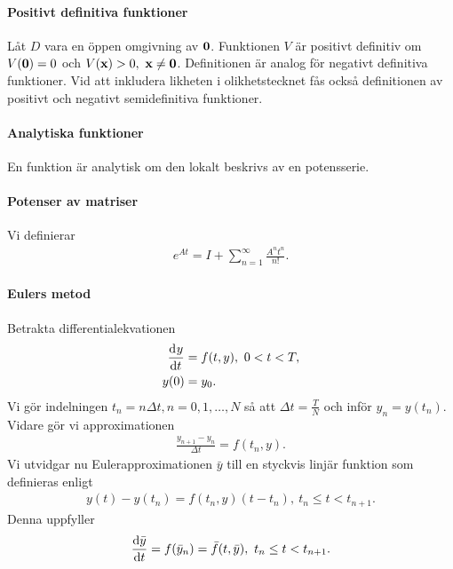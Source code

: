 \paragraph{Positivt definitiva funktioner}
Låt $D$ vara en öppen omgivning av $\vb{0}$. Funktionen $V$ är positivt definitiv om $V(\vb{0}) = 0$ och $V(\vb{x}) > 0,\ \vb{x}\neq\vb{0}$. Definitionen är analog för negativt definitiva funktioner. Vid att inkludera likheten i olikhetstecknet fås också definitionen av positivt och negativt semidefinitiva funktioner.

\paragraph{Analytiska funktioner}
En funktion är analytisk om den lokalt beskrivs av en potensserie.

\paragraph{Potenser av matriser}
Vi definierar
\begin{align*}
	e^{At} = I + \sum\limits_{n = 1}^{\infty}\frac{A^{n}t^{n}}{n!}.
\end{align*}

\paragraph{Eulers metod}
Betrakta differentialekvationen
\begin{align*}
	\dv[]{y}{t} (t) &= f(t, y),\ 0 < t < T, \\
	y(0)             &= y_0.
\end{align*}
Vi gör indelningen $t_n = n\Delta t, n = 0, 1, \dots, N$ så att $\Delta t = \frac{T}{N}$ och inför $y_n = y(t_n)$. Vidare gör vi approximationen
\begin{align*}
	\frac{y_{n + 1} - y_{n}}{\Delta t} = f(t_n, y).
\end{align*}
Vi utvidgar nu Eulerapproximationen $\bar{y}$ till en styckvis linjär funktion som definieras enligt
\begin{align*}
	y(t) - y(t_{n}) = f(t_n, y)(t - t_{n}),\ t_n \leq t < t_{n + 1}.
\end{align*}
Denna uppfyller
\begin{align*}
	\dv{\bar{y}}{t} = f(\bar{y}_{n}) = \bar{f}(t, \bar{y}),\ t_n \leq t < t_{n + 1}.
\end{align*}

